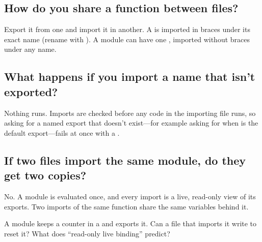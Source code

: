 \label{ch:c14}

\subsection{How do you share a function between files?}%
Export it from one  and import it in another. A  is imported in braces under its exact name (rename with ). A module can have one , imported without braces under any name.

\subsection{What happens if you import a name that isn't exported?}%
Nothing runs. Imports are checked before any code in the importing file runs, so asking for a named export that doesn't exist---for example asking for  when  is the default export---fails at once with a .

\subsection{If two files import the same module, do they get two copies?}%
No. A module is evaluated once, and every import is a live, read-only view of its exports. Two imports of the same function share the same variables behind it.

\begin{ponder}A module keeps a counter in a  and exports it. Can a file that imports it write  to reset it? What does ``read-only live binding'' predict?\end{ponder}
